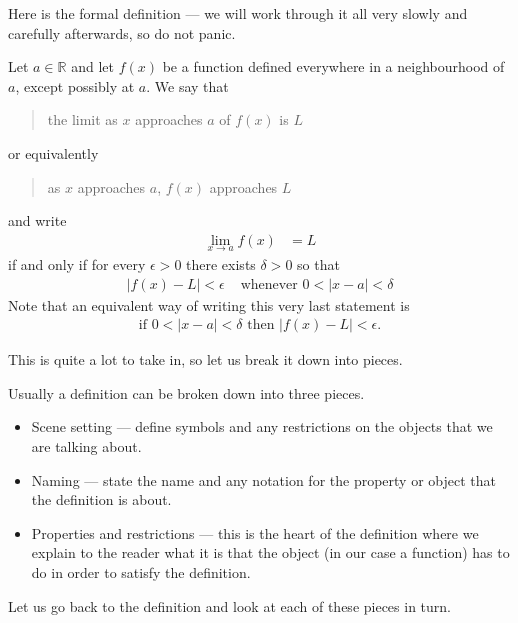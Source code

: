 Here is the formal definition --- we will work through it all very slowly and
carefully afterwards, so do not panic.
\begin{defn}\label{def_1_7_1}
 Let $a \in \mathbb{R}$ and let $f(x)$ be a function defined everywhere in a
neighbourhood of $a$, except possibly at $a$. We say that
\begin{quote}
 the limit as $x$ approaches $a$ of $f(x)$ is $L$
\end{quote}
or equivalently
\begin{quote}
 as $x$ approaches $a$, $f(x)$ approaches $L$
\end{quote}
and write
\begin{align*}
  \lim_{x \to a} f(x) &= L
\end{align*}
if and only if for every $\epsilon >0$ there exists $\delta>0$ so that
\begin{align*}
  |f(x) - L| <\epsilon & \text{ whenever } 0<|x-a| < \delta
\end{align*}
Note that an equivalent way of writing this very last statement is
\begin{align*}
  \text{if } 0<|x-a| < \delta \text{ then } |f(x) - L| <\epsilon.
\end{align*}
\end{defn}
This is quite a lot to take in, so let us break it down into pieces.
\begin{defn}\label{def_1_7_2}
Usually a definition can be broken down into three pieces.
 \begin{itemize}
  \item Scene setting --- define symbols and any
restrictions on the objects that we are talking about.
  \item Naming --- state the name and any notation for the property or object
that the definition is about.
  \item Properties and restrictions --- this is the heart of the definition
where we explain to the reader what it is that the object (in our case a
function) has to do in order to satisfy the definition.
 \end{itemize}
\end{defn}
Let us go back to the definition and look at each of these pieces in turn.
